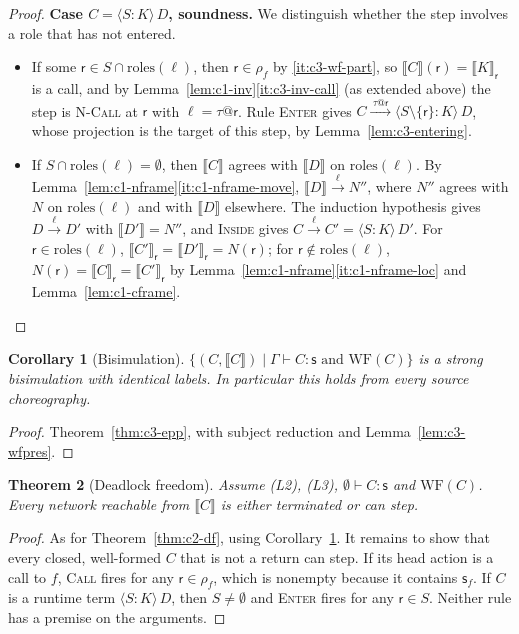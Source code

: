 \documentclass[11pt]{report}
\makeatletter
\theoremstyle{plain}
\newtheorem{theorem}{Theorem}[chapter]
\newtheorem{corollary}[theorem]{Corollary}
\theoremstyle{definition}
\theoremstyle{remark}
\newcommand{\rr}{\mathsf{r}}
\newcommand{\sr}{\mathsf{s}}
\newcommand{\rt}[3]{\langle #1 : #2\rangle\,#3}
\newcommand{\roles}[1]{\mathrm{roles}(#1)}
\newcommand{\WF}{\mathrm{WF}}
\newcommand{\tauat}[1]{\tau\mathord{@}#1}
\newcommand{\lto}[1]{\xrightarrow{\;#1\;}}
\newcommand{\proj}[2]{\llbracket #1 \rrbracket_{#2}}
\newcommand{\projn}[1]{\llbracket #1 \rrbracket}
\newcommand{\rn}[1]{{\normalfont\scshape #1}}
\newcommand{\case}[1]{\medskip\noindent\textbf{Case #1.}\;}
\makeatother
\begin{document}
\begin{proof}
  \case{$C=\rt{S}{K}{D}$, soundness}
  We distinguish whether the step involves a role that has not entered.
  \begin{itemize}
  \item If some $\rr\in S\cap\roles{\ell}$, then $\rr\in\rho_f$ by
    \ref{it:c3-wf-part}, so $\projn{C}(\rr)=\proj{K}{\rr}$ is a call, and by
    Lemma~\ref{lem:c1-inv}\ref{it:c3-inv-call} (as extended above) the step is \rn{N-Call} at
    $\rr$ with $\ell=\tauat{\rr}$.  Rule \rn{Enter} gives
    $C\lto{\tauat{\rr}}\rt{S\setminus\{\rr\}}{K}{D}$, whose projection is the
    target of this step, by Lemma~\ref{lem:c3-entering}.
  \item If $S\cap\roles{\ell}=\emptyset$, then $\projn{C}$ agrees with
    $\projn{D}$ on $\roles{\ell}$.  By
    Lemma~\ref{lem:c1-nframe}\ref{it:c1-nframe-move},
    $\projn{D}\lto{\ell}N''$, where $N''$ agrees with $N$ on $\roles{\ell}$
    and with $\projn{D}$ elsewhere.  The induction hypothesis gives
    $D\lto{\ell}D'$ with $\projn{D'}=N''$, and \rn{Inside} gives
    $C\lto{\ell}C'=\rt{S}{K}{D'}$.  For $\rr\in\roles{\ell}$,
    $\proj{C'}{\rr}=\proj{D'}{\rr}=N(\rr)$; for $\rr\notin\roles{\ell}$,
    $N(\rr)=\proj{C}{\rr}=\proj{C'}{\rr}$ by
    Lemma~\ref{lem:c1-nframe}\ref{it:c1-nframe-loc} and
    Lemma~\ref{lem:c1-cframe}.\qedhere
  \end{itemize}
\end{proof}

\begin{corollary}[Bisimulation]\label{cor:c3-bisim}
  $\{(C,\projn{C})\mid\Gamma\vdash C:\sr \text{ and } \WF(C)\}$ is a strong
  bisimulation with identical labels.  In particular this holds from every
  source choreography.
\end{corollary}
\begin{proof}
  Theorem~\ref{thm:c3-epp}, with subject reduction and
  Lemma~\ref{lem:c3-wfpres}.
\end{proof}

\begin{theorem}[Deadlock freedom]\label{thm:c3-df}
  Assume (L2), (L3), $\emptyset\vdash C:\sr$ and $\WF(C)$.  Every network
  reachable from $\projn{C}$ is either terminated or can step.
\end{theorem}
\begin{proof}
  As for Theorem~\ref{thm:c2-df}, using Corollary~\ref{cor:c3-bisim}.  It
  remains to show that every closed, well-formed $C$ that is not a return can
  step.  If its head action is a call to $f$, \rn{Call} fires for any
  $\rr\in\rho_f$, which is nonempty because it contains $\sr_f$.  If $C$ is a
  runtime term $\rt{S}{K}{D}$, then $S\neq\emptyset$ and \rn{Enter} fires for
  any $\rr\in S$.  Neither rule has a premise on the arguments.
\end{proof}
\end{document}
